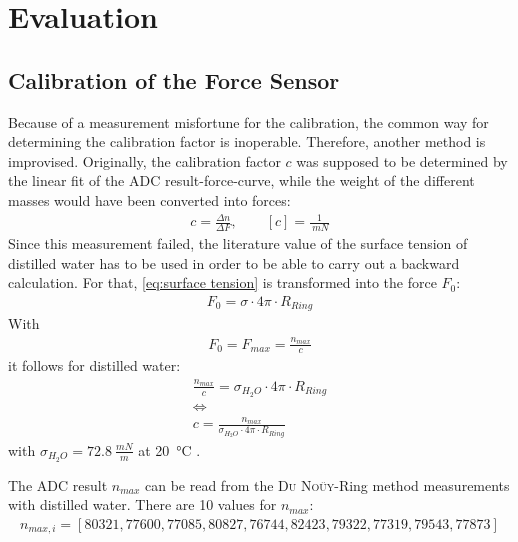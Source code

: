 \chapter{Evaluation}
%
    \section{Calibration of the Force Sensor}
        Because of a measurement misfortune for the calibration, the common way for determining the calibration factor is
        inoperable. Therefore, another method is improvised. Originally, the calibration factor \(c\) was supposed to be
        determined by the linear fit of the ADC result-force-curve, while the weight of the different masses would have
        been converted into forces:
        \begin{align}
            c=\frac{\Delta n}{\Delta F}, \qquad [c]=\frac{1}{\SI{}{mN}}
        \end{align}
        Since this measurement failed, the literature value of the surface tension of distilled water has to be used in
        order to be able to carry out a backward calculation. For that, \cref{eq:surface tension} is transformed into the
        force \(F_0\):
        \begin{align*}
            F_0=\sigma \cdot 4\pi \cdot R_{Ring}
        \end{align*}
        With
        \begin{align}
            F_0=F_{max}=\frac{n_{max}}{c}
            \label{eq:force}
        \end{align}
        it follows for distilled water:
        \begin{gather}
            \frac{n_{max}}{c}           =\sigma_{H_2O} \cdot 4\pi \cdot R_{Ring} \nonumber \\
            \Leftrightarrow \nonumber\\
            c                           =\frac{n_{max}}{\sigma_{H_2O} \cdot 4\pi \cdot R_{Ring}}
            \label{eq:calibration factor}
        \end{gather}
        with \(\sigma_{H_2O}=\SI{72.8}{\frac{mN}{m}}\) at \SI{20}{\celsius} \cite{Eichler.2016}.
        \par\medskip
        The ADC result \(n_{max}\) can be read from the \textsc{Du Noüy}-Ring method measurements with distilled water. There are
        10 values for \(n_{max}\):
        \begin{align*}
            n_{max,i}=[80321, 77600, 77085, 80827, 76744, 82423, 79322, 77319, 79543, 77873]
        \end{align*}
